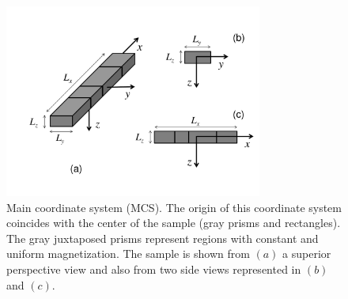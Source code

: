 \documentclass[galley,gc]{agutex}
\begin{document}
\begin{article}
%

%
%
\end{article}

%
%
%
%

 \clearpage
 
 \begin{figure}
 \noindent \includegraphics[width=20pc]{Figs/Fig1_HQ.pdf}
 \caption{Main coordinate system (MCS). The origin of this coordinate system 
 coincides with the center of the sample (gray prisms and rectangles).
 The gray juxtaposed prisms represent 
 regions with constant and uniform magnetization. 
 The sample is shown from 
 $\left(a\right)$ a superior perspective view and also from two side 
 views represented in $\left(b\right)$ and $\left(c\right)$.}
 \label{fig:sample}
 \end{figure} 
 
\end{document}
